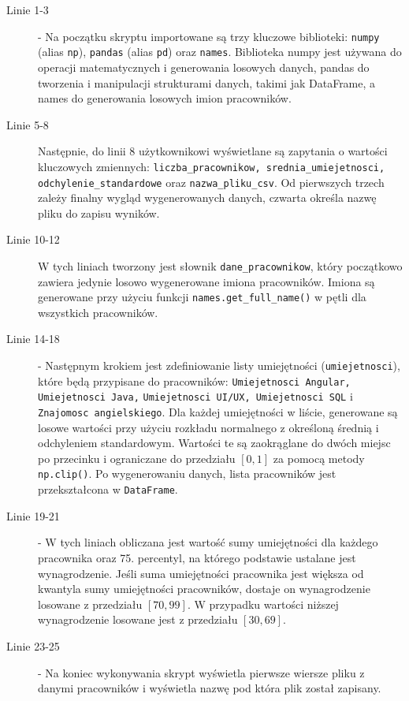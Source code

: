 

\begin{description}
    \item[Linie 1-3] - Na początku skryptu importowane są trzy kluczowe biblioteki: \verb|numpy| (alias \verb|np|), \verb|pandas| (alias \verb|pd|) oraz \verb|names|. Biblioteka numpy jest używana do operacji matematycznych i generowania losowych danych, pandas do tworzenia i manipulacji strukturami danych, takimi jak DataFrame, a names do generowania losowych imion pracowników. 
    
    \item[Linie 5-8] Następnie, do linii 8 użytkownikowi wyświetlane są zapytania o wartości kluczowych zmiennych: \verb|liczba_pracownikow, srednia_umiejetnosci, odchylenie_standardowe| oraz \verb|nazwa_pliku_csv|. Od pierwszych trzech zależy finalny wygląd wygenerowanych danych, czwarta określa nazwę pliku do zapisu wyników.
    
    \item[Linie 10-12] W tych liniach tworzony jest słownik \verb |dane_pracownikow|, który początkowo zawiera jedynie losowo wygenerowane imiona pracowników. Imiona są generowane przy użyciu funkcji \verb |names.get_full_name()| w pętli dla wszystkich pracowników.
    
    \item[Linie 14-18] - Następnym krokiem jest zdefiniowanie listy umiejętności (\verb|umiejetnosci|), które będą przypisane do pracowników: \verb|Umiejetnosci Angular, Umiejetnosci Java,| \verb|Umiejetnosci UI/UX, Umiejetnosci SQL| i \verb|Znajomosc angielskiego|. Dla każdej umiejętności w liście, generowane są losowe wartości przy użyciu rozkładu normalnego z określoną średnią i odchyleniem standardowym. Wartości te są zaokrąglane do dwóch miejsc po przecinku i ograniczane do przedziału $[0, 1]$ za pomocą metody \verb|np.clip()|. Po wygenerowaniu danych, lista pracowników jest przekształcona w \verb|DataFrame|.
    
    \item[Linie 19-21] - W tych liniach obliczana jest wartość sumy umiejętności dla każdego pracownika oraz 75. percentyl, na którego podstawie ustalane jest wynagrodzenie. Jeśli suma umiejętności pracownika jest większa od kwantyla sumy umiejętności pracowników, dostaje on wynagrodzenie losowane z przedziału $[70, 99]$. W przypadku wartości niższej wynagrodzenie losowane jest z przedziału $[30, 69]$.
    \item[Linie 23-25] - Na koniec wykonywania skrypt wyświetla pierwsze wiersze pliku z danymi pracowników i wyświetla nazwę pod która plik został zapisany.
\end{description}

